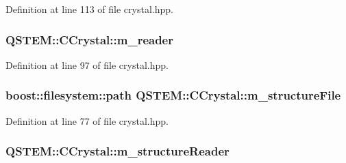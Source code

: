 Definition at line 113 of file crystal.\-hpp.

\hypertarget{class_q_s_t_e_m_1_1_c_crystal_a31f0c0f7a7aa072c11530663515dfe68}{
\subsubsection[{m\-\_\-reader}]{ Q\-S\-T\-E\-M\-::\-C\-Crystal\-::m\-\_\-reader\hspace{0.3cm}{\ttfamily [protected]}}}\label{class_q_s_t_e_m_1_1_c_crystal_a31f0c0f7a7aa072c11530663515dfe68}


Definition at line 97 of file crystal.\-hpp.

\hypertarget{class_q_s_t_e_m_1_1_c_crystal_a0e280f0c5d05374ba60b7eea4e2fc052}{
\subsubsection[{m\-\_\-structure\-File}]{\setlength{\rightskip}{0pt plus 5cm}boost\-::filesystem\-::path Q\-S\-T\-E\-M\-::\-C\-Crystal\-::m\-\_\-structure\-File\hspace{0.3cm}{\ttfamily [protected]}}}\label{class_q_s_t_e_m_1_1_c_crystal_a0e280f0c5d05374ba60b7eea4e2fc052}


Definition at line 77 of file crystal.\-hpp.

\hypertarget{class_q_s_t_e_m_1_1_c_crystal_ae4fc5007296cb4116827ec927b1454f7}{
\subsubsection[{m\-\_\-structure\-Reader}]{ Q\-S\-T\-E\-M\-::\-C\-Crystal\-::m\-\_\-structure\-Reader\hspace{0.3cm}{\ttfamily [protected]}}}\label{class_q_s_t_e_m_1_1_c_crystal_ae4fc5007296cb4116827ec927b1454f7}


